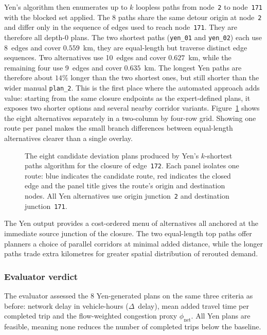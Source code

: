 Yen's algorithm then enumerates up to $k$ loopless paths from
node~\texttt{2} to node~\texttt{171} with the blocked set applied. 
The 8 paths share the same detour origin at node~\texttt{2} and differ
only in the sequence of edges used to reach node~\texttt{171}. They are
therefore all depth-0 plans. The two shortest paths (\texttt{yen\_01} and
\texttt{yen\_02}) each use 8~edges and cover $0.559$~km, they are
equal-length but traverse distinct edge sequences. Two alternatives use
10~edges and cover $0.627$~km, while the remaining four use 9~edges and
cover $0.635$~km. The longest Yen paths are therefore about $14\%$ longer
than the two shortest ones, but still shorter than the wider manual
\texttt{plan\_2}. This is the first place where the automated approach adds
value: starting from the same closure endpoints as the expert-defined plans,
it exposes two shorter options and several nearby corridor variants.
Figure~\ref{fig:results_yen_alternative_grid} shows the eight alternatives
separately in a two-column by four-row grid. Showing one route per panel makes
the small branch differences between equal-length alternatives clearer than a
single overlay.

\begin{figure}[H]
  \centering
  \caption{The eight candidate deviation plans produced by Yen's
  $k$-shortest paths algorithm for the closure of edge~\texttt{172}. Each
  panel isolates one route: blue indicates the candidate route, red indicates
  the closed edge and the panel title gives the route's origin and
  destination nodes. All Yen alternatives use origin junction~\texttt{2} and
  destination junction~\texttt{171}.}
  \label{fig:results_yen_alternative_grid}
\end{figure}

The Yen output provides a cost-ordered menu of alternatives all anchored at
the immediate source junction of the closure. The two equal-length top paths
offer planners a choice of parallel corridors at minimal added distance, while
the longer paths trade extra kilometres for greater spatial distribution of
rerouted demand.

\subsubsection{Evaluator verdict}
The evaluator assessed the 8 Yen-generated plans on the same three criteria
as before: network delay in vehicle-hours ($\Delta$~delay), mean added travel
time per completed trip and the flow-weighted congestion proxy
$\phi_\text{net}$. All Yen plans are feasible, meaning none reduces the
number of completed trips below the baseline.


